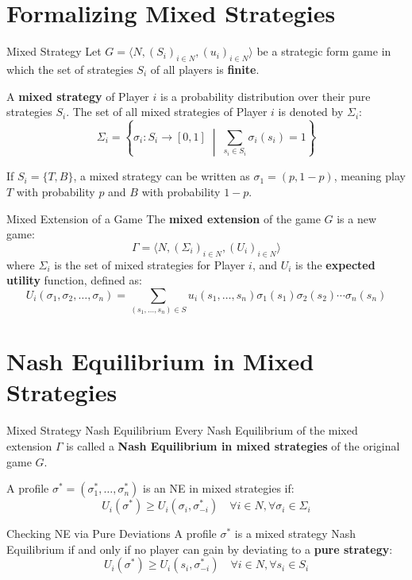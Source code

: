 \documentclass[12pt, a4paper]{article}
\begin{document}
\section{Formalizing Mixed Strategies}

\begin{defbox}{Mixed Strategy}
  Let $G = \langle N, (S_i)_{i \in N}, (u_i)_{i \in N} \rangle$ be a strategic form game in which the set of strategies $S_i$ of all players is \textbf{finite}. 
  
  A \textbf{mixed strategy} of Player $i$ is a probability distribution over their pure strategies $S_i$. 
  The set of all mixed strategies of Player $i$ is denoted by $\Sigma_i$:
  \[
    \Sigma_i = \left\{ \sigma_i : S_i \to [0,1] \;\middle|\; \sum_{s_i \in S_i} \sigma_i(s_i) = 1 \right\}
  \]
\end{defbox}

If $S_i = \{T, B\}$, a mixed strategy can be written as $\sigma_1 = (p, 1-p)$, meaning play $T$ with probability $p$ and $B$ with probability $1-p$.

\begin{defbox}{Mixed Extension of a Game}
  The \textbf{mixed extension} of the game $G$ is a new game:
  \[
    \Gamma = \langle N, (\Sigma_i)_{i \in N}, (U_i)_{i \in N} \rangle
  \]
  where $\Sigma_i$ is the set of mixed strategies for Player $i$, and $U_i$ is the \textbf{expected utility} function, defined as:
  \[
    U_i(\sigma_1, \sigma_2, \dots, \sigma_n) = \sum_{(s_1, \dots, s_n) \in S} u_i(s_1, \dots, s_n) \sigma_1(s_1) \sigma_2(s_2) \cdots \sigma_n(s_n)
  \]
\end{defbox}

\section{Nash Equilibrium in Mixed Strategies}

\begin{defbox}{Mixed Strategy Nash Equilibrium}
  Every Nash Equilibrium of the mixed extension $\Gamma$ is called a \textbf{Nash Equilibrium in mixed strategies} of the original game $G$.
  
  A profile $\sigma^* = (\sigma_1^*, \dots, \sigma_n^*)$ is an NE in mixed strategies if:
  \[
    U_i(\sigma^*) \geq U_i(\sigma_i, \sigma_{-i}^*) \quad \forall i \in N, \forall \sigma_i \in \Sigma_i
  \]
\end{defbox}

\begin{thmbox}{Checking NE via Pure Deviations}
  A profile $\sigma^*$ is a mixed strategy Nash Equilibrium if and only if no player can gain by deviating to a \textbf{pure strategy}:
  \[
    U_i(\sigma^*) \geq U_i(s_i, \sigma_{-i}^*) \quad \forall i \in N, \forall s_i \in S_i
  \]
\end{thmbox}
\end{document}
